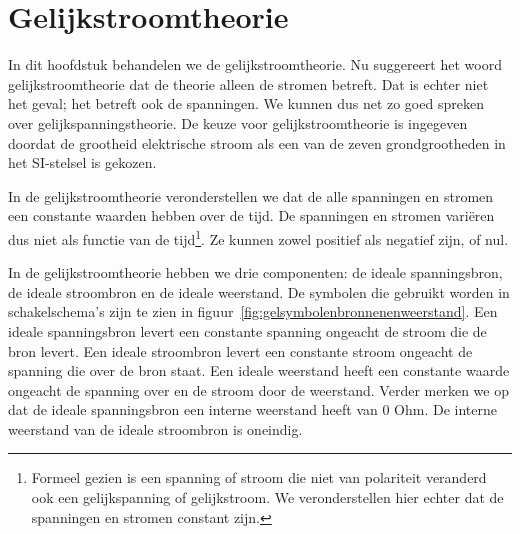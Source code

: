 \chapter{Gelijkstroomtheorie}
\label{cha:gelijkstroomtheorie}

\iffalse

In dit hoofdstuk behandelen we de gelijkstroomtheorie. Nu suggereert het woord
gelijkstroomtheorie dat de theorie alleen de stromen betreft. Dat is echter niet
het geval; het betreft ook de spanningen. We kunnen dus net zo goed spreken over
gelijkspanningstheorie. De keuze voor gelijkstroomtheorie is ingegeven doordat de
grootheid elektrische stroom als een van de zeven grondgrootheden in
het SI-stelsel is gekozen.

In de gelijkstroomtheorie veronderstellen we dat de alle spanningen en stromen
een constante waarden hebben over de tijd. De spanningen en stromen vari\"eren
dus niet als functie van de tijd\footnote{Formeel gezien is een spanning of stroom
die niet van polariteit veranderd ook een gelijkspanning of gelijkstroom. We
veronderstellen hier echter dat de spanningen en stromen constant zijn.}.
Ze kunnen zowel positief als negatief zijn, of nul.

In de gelijkstroomtheorie hebben we drie componenten: de ideale spanningsbron,
de ideale stroombron en de ideale weerstand. De symbolen die gebruikt worden in
schakelschema's zijn te zien in figuur~\ref{fig:gelsymbolenbronnenenweerstand}. Een
ideale spanningsbron levert een constante spanning ongeacht de stroom die de bron
levert. Een ideale stroombron levert een constante stroom ongeacht de spanning die
over de bron staat. Een ideale weerstand heeft een constante waarde ongeacht de
spanning over en de stroom door de weerstand. Verder merken we op dat de ideale
spanningsbron een interne weerstand heeft van 0 Ohm. De interne weerstand van de
ideale stroombron is oneindig.


